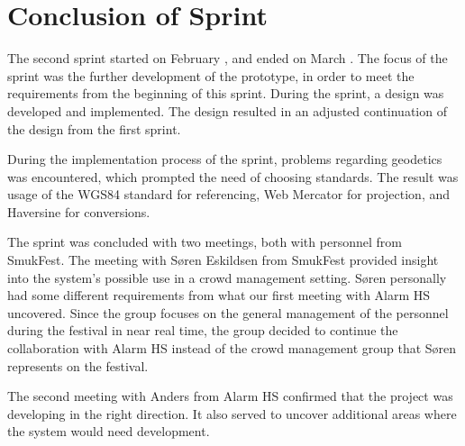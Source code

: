 \section{Conclusion of Sprint}
The second sprint started on February , and ended on March . The focus of the sprint was the further development of the prototype, in order to meet the requirements from the beginning of this sprint. During the sprint, a design was developed and implemented. The design resulted in an adjusted continuation of the design from the first sprint.

During the implementation process of the sprint, problems regarding geodetics was encountered, which prompted the need of choosing standards. The result was usage of the WGS84 standard for referencing, Web Mercator for projection, and Haversine for conversions.

The sprint was concluded with two meetings, both with personnel from SmukFest. The meeting with Søren Eskildsen from SmukFest provided insight into the system's possible use in a crowd management setting. Søren personally had some different requirements from what our first meeting with Alarm HS uncovered. Since the group focuses on the general management of the personnel during the festival in near real time, the group decided to continue the collaboration with Alarm HS instead of the crowd management group that Søren represents on the festival.

The second meeting with Anders from Alarm HS confirmed that the project was developing in the right direction. It also served to uncover additional areas where the system would need development.